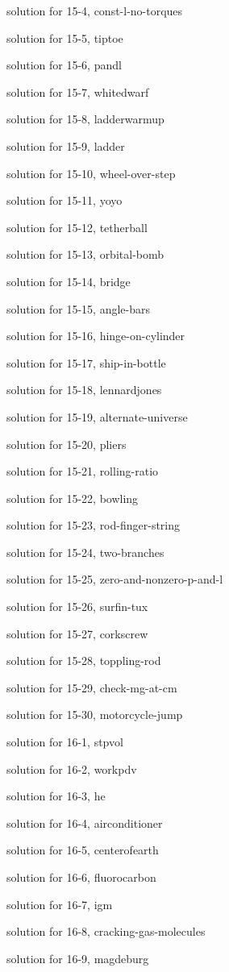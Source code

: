 \documentclass{problems}
\begin{document}
solution for 15-4, const-l-no-torques

solution for 15-5, tiptoe

solution for 15-6, pandl

solution for 15-7, whitedwarf

solution for 15-8, ladderwarmup

solution for 15-9, ladder

solution for 15-10, wheel-over-step

solution for 15-11, yoyo

solution for 15-12, tetherball

solution for 15-13, orbital-bomb

solution for 15-14, bridge

solution for 15-15, angle-bars

solution for 15-16, hinge-on-cylinder

solution for 15-17, ship-in-bottle

solution for 15-18, lennardjones

solution for 15-19, alternate-universe

solution for 15-20, pliers

solution for 15-21, rolling-ratio

solution for 15-22, bowling

solution for 15-23, rod-finger-string

solution for 15-24, two-branches

solution for 15-25, zero-and-nonzero-p-and-l

solution for 15-26, surfin-tux

solution for 15-27, corkscrew

solution for 15-28, toppling-rod

solution for 15-29, check-mg-at-cm

solution for 15-30, motorcycle-jump

solution for 16-1, stpvol

solution for 16-2, workpdv

solution for 16-3, he

solution for 16-4, airconditioner

solution for 16-5, centerofearth

solution for 16-6, fluorocarbon

solution for 16-7, igm

solution for 16-8, cracking-gas-molecules

solution for 16-9, magdeburg
\end{document}
